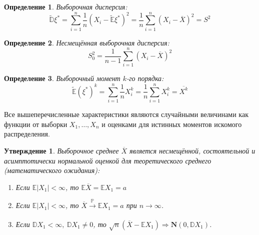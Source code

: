 \documentclass[oneside,final,14pt]{extreport}
\theoremstyle{plain}
\newtheorem*{thm*}{Утверждение}
\theoremstyle{definition}
\newtheorem*{defn}{Определение}
\theoremstyle{named}
\begin{document}
\begin{defn}
{\it Выборочная дисперсия:}
\begin{equation*}
    \tilde{\mathbb{D}} \xi^{*}=\sum\limits_{i=1}^{n} \frac{1}{n}(X_{i}-\tilde{\mathbb{E}} \xi^{*})^{2}=\frac{1}{n} \sum\limits_{i=1}^{n}(X_{i}-\overline{X})^{2}=S^{2}
\end{equation*}
\end{defn}

\begin{defn}
{\it Несмещённая выборочная дисперсия:} 
\begin{equation*}
    S_{0}^{2}=\frac{1}{n-1} \sum\limits_{i=1}^{n}\left(X_{i}-\overline{X}\right)^{2}
\end{equation*}
\end{defn}

\begin{defn}
{\it Выборочный момент $k$-го порядка:}
\begin{equation*}
    \tilde{\mathbb{E}}(\xi^{*})^{k}=\sum\limits_{i=1}^{n} \frac{1}{n} X_{i}^{k}=\frac{1}{n} \sum\limits_{i=1}^{n} X_{i}^{k}=\overline{X^{k}}
\end{equation*}
\end{defn}

Все вышеперечисленные характеристики являются случайными величинами как функции от выборки $X_{1}, \ldots, X_{n}$ и оценками для истинных моментов искомого распределения.

\begin{thm*}
Выборочное среднее $\overline{X}$ является несмещённой, состоятельной и асимптотически нормальной оценкой для теоретического среднего (математического ожидания):

\begin{enumerate}[label={\arabic*.}]
    \item Если $\mathbb{E}|X_{1}|<\infty$, то $\mathbb{E}\overline{X}=\mathbb{E} X_{1}=a$
    \item Если $\mathbb{E}|X_{1}|<\infty$, то $\overline{X} \xrightarrow[]{\mathbb{P}} \mathbb{E} X_{1}=a$ при $n \rightarrow \infty$.
    \item Если $\mathbb{D} X_{1}<\infty,~ \mathbb{D} X_{1} \neq 0$, то $\sqrt{n}(\overline{X}-\mathbb{E} X_{1}) \Rightarrow \mathbf{N}(0, \mathbb{D} X_{1})$.
\end{enumerate}
\end{thm*}
\end{document}
